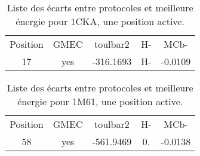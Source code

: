     \begin{table}[h]
      \centering

      \begin{tabular}{ccccc}


        \toprule
        Position & GMEC & toulbar2 & H- & MCb- \\
        \cmidrule{1-3}
        17 & yes & -316.1693 & H- & -0.0109 \\

        \bottomrule
      \end{tabular}      
      \caption{Liste des écarts entre protocoles et meilleure énergie pour 1CKA, une position active.}
\label{tab:result_1_active_1CKA}      
    \end{table}

    \begin{table}[h]
      \centering

      \begin{tabular}{ccccc}

        \toprule
        Position & GMEC & toulbar2 & H- & MCb- \\
        \cmidrule{1-3}
        58 & yes & -561.9469 & 0. & -0.0138 \\
       \bottomrule        
      \end{tabular}      
      \caption{Liste des écarts entre protocoles et meilleure énergie pour 1M61, une position active.}
\label{tab:result_1_active_1M61}      
    \end{table}
    

